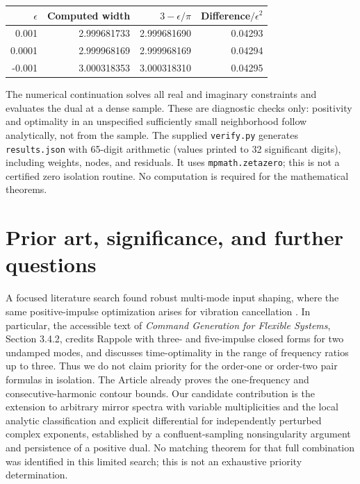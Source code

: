 \documentclass[11pt]{article}
\theoremstyle{remark}\newtheorem{remark}[theorem]{Remark}
\begin{document}
\begin{center}
\begin{tabular}{rrrr}
\toprule
$\epsilon$ & Computed width & $3-\epsilon/\pi$ & Difference$/\epsilon^2$\\\midrule
0.001 & 2.999681733 & 2.999681690 & 0.04293\\
0.0001 & 2.999968169 & 2.999968169 & 0.04294\\
-0.001 & 3.000318353 & 3.000318310 & 0.04295\\\bottomrule
\end{tabular}
\end{center}
The numerical continuation solves all real and imaginary constraints and evaluates the dual at a dense sample. These are diagnostic checks only: positivity and optimality in an unspecified sufficiently small neighborhood follow analytically, not from the sample. The supplied \texttt{verify.py} generates \texttt{results.json} with 65-digit arithmetic (values printed to 32 significant digits), including weights, nodes, and residuals. It uses \texttt{mpmath.zetazero}; this is not a certified zero isolation routine. No computation is required for the mathematical theorems.

\section{Prior art, significance, and further questions}
A focused literature search found robust multi-mode input shaping, where the same positive-impulse optimization arises for vibration cancellation \cite{lau,pao,command}. In particular, the accessible text of \emph{Command Generation for Flexible Systems}, Section 3.4.2, credits Rappole with three- and five-impulse closed forms for two undamped modes, and discusses time-optimality in the range of frequency ratios up to three. Thus we do not claim priority for the order-one or order-two pair formulas in isolation. The Article already proves the one-frequency and consecutive-harmonic contour bounds. Our candidate contribution is the extension to arbitrary mirror spectra with variable multiplicities and the local analytic classification and explicit differential for independently perturbed complex exponents, established by a confluent-sampling nonsingularity argument and persistence of a positive dual. No matching theorem for that full combination was identified in this limited search; this is not an exhaustive priority determination.
\end{document}
